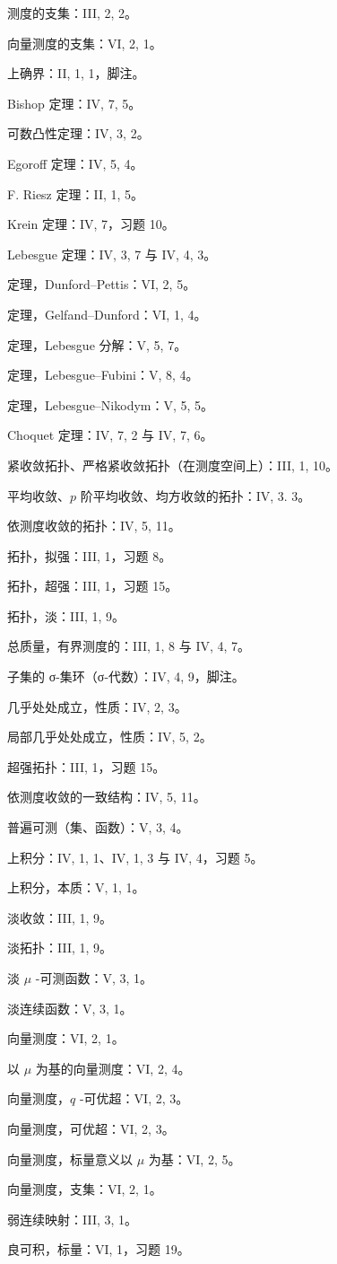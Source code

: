 测度的支集：III, 2, 2。

向量测度的支集：VI, 2, 1。

上确界：II, 1, 1，脚注。

Bishop 定理：IV, 7, 5。

可数凸性定理：IV, 3, 2。

Egoroff 定理：IV, 5, 4。

F. Riesz 定理：II, 1, 5。

Krein 定理：IV, 7，习题 10。

Lebesgue 定理：IV, 3, 7 与 IV, 4, 3。

定理，Dunford--Pettis：VI, 2, 5。

定理，Gelfand--Dunford：VI, 1, 4。

定理，Lebesgue 分解：V, 5, 7。

定理，Lebesgue--Fubini：V, 8, 4。

定理，Lebesgue--Nikodym：V, 5, 5。

Choquet 定理：IV, 7, 2 与 IV, 7, 6。

紧收敛拓扑、严格紧收敛拓扑（在测度空间上）：III, 1, 10。

平均收敛、\(p\) 阶平均收敛、均方收敛的拓扑：IV, 3. 3。

依测度收敛的拓扑：IV, 5, 11。

拓扑，拟强：III, 1，习题 8。

拓扑，超强：III, 1，习题 15。

拓扑，淡：III, 1, 9。

总质量，有界测度的：III, 1, 8 与 IV, 4, 7。

子集的 σ-集环（σ-代数）：IV, 4, 9，脚注。

几乎处处成立，性质：IV, 2, 3。

局部几乎处处成立，性质：IV, 5, 2。

超强拓扑：III, 1，习题 15。

依测度收敛的一致结构：IV, 5, 11。

普遍可测（集、函数）：V, 3, 4。

上积分：IV, 1, 1、IV, 1, 3 与 IV, 4，习题 5。

上积分，本质：V, 1, 1。

淡收敛：III, 1, 9。

淡拓扑：III, 1, 9。

淡 \(\mu\) -可测函数：V, 3, 1。

淡连续函数：V, 3, 1。

向量测度：VI, 2, 1。

以 \(\mu\) 为基的向量测度：VI, 2, 4。

向量测度，\(q\) -可优超：VI, 2, 3。

向量测度，可优超：VI, 2, 3。

向量测度，标量意义以 \(\mu\) 为基：VI, 2, 5。

向量测度，支集：VI, 2, 1。

弱连续映射：III, 3, 1。

良可积，标量：VI, 1，习题 19。

